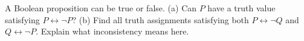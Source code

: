 A Boolean proposition can be true or false. (a) Can $P$ have a truth value satisfying $P\leftrightarrow\neg P$? (b) Find all truth assignments satisfying both $P\leftrightarrow\neg Q$ and $Q\leftrightarrow\neg P$. Explain what inconsistency means here.
